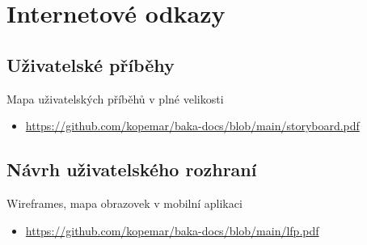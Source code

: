 \documentclass[twoside]{ctuthesis}
\begin{document}
%
%

\printbibliography[title={Seznam použité literatury}]

\appendix

%



\chapter{Internetové odkazy}
\section{Uživatelské příběhy}\label{sec:user-story}

Mapa uživatelských příběhů v plné velikosti
\begin{itemize}
	\item \url{https://github.com/kopemar/baka-docs/blob/main/storyboard.pdf}
\end{itemize}


\section{Návrh uživatelského rozhraní}\label{sec:ui}

Wireframes, mapa obrazovek v mobilní aplikaci
\begin{itemize}
	\item \url{https://github.com/kopemar/baka-docs/blob/main/lfp.pdf}
\end{itemize}
\end{document}
